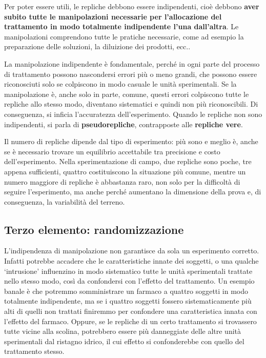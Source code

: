 \documentclass[a4paper,12pt,oneside]{book}
\theoremstyle{definition}
\theoremstyle{definition}
\theoremstyle{definition}
\theoremstyle{remark}
\begin{document}
Per poter essere utili, le repliche debbono essere indipendenti, cioè
debbono \textbf{aver subito tutte le manipolazioni necessarie per
l'allocazione del trattamento in modo totalmente indipendente l'una
dall'altra}. Le manipolazioni comprendono tutte le pratiche necessarie,
come ad esempio la preparazione delle soluzioni, la diluizione dei
prodotti, ecc..

La manipolazione indipendente è fondamentale, perché in ogni parte del
processo di trattamento possono nascondersi errori più o meno grandi,
che possono essere riconosciuti solo se colpiscono in modo casuale le
unità sperimentali. Se la manipolazione è, anche solo in parte, comune,
questi errori colpiscono tutte le repliche allo stesso modo, diventano
sistematici e quindi non più riconoscibili. Di conseguenza, si inficia
l'accuratezza dell'esperimento. Quando le repliche non sono
indipendenti, si parla di \textbf{pseudorepliche}, contrapposte alle
\textbf{repliche vere}.

Il numero di repliche dipende dal tipo di esperimento: più sono e meglio
è, anche se è necessario trovare un equilibrio accettabile tra
precisione e costo dell'esperimento. Nella sperimentazione di campo, due
repliche sono poche, tre appena sufficienti, quattro costituiscono la
situazione più comune, mentre un numero maggiore di repliche è
abbastanza raro, non solo per la difficoltà di seguire l'esperimento, ma
anche perché aumentano la dimensione della prova e, di conseguenza, la
variabilità del terreno.

\subsection{Terzo elemento:
randomizzazione}\label{terzo-elemento-randomizzazione}

L'indipendenza di manipolazione non garantisce da sola un esperimento
corretto. Infatti potrebbe accadere che le caratteristiche innate dei
soggetti, o una qualche `intrusione' influenzino in modo sistematico
tutte le unità sperimentali trattate nello stesso modo, così da
confondersi con l'effetto del trattamento. Un esempio banale è che
potremmo somministrare un farmaco a quattro soggetti in modo totalmente
indipendente, ma se i quattro soggetti fossero sistematicamente più alti
di quelli non trattati finiremmo per confondere una caratteristica
innata con l'effetto del farmaco. Oppure, se le repliche di un certo
trattamento si trovassero tutte vicine alla scolina, potrebbero essere
più danneggiate delle altre unità sperimentali dal ristagno idrico, il
cui effetto si confonderebbe con quello del trattamento stesso.
\end{document}
